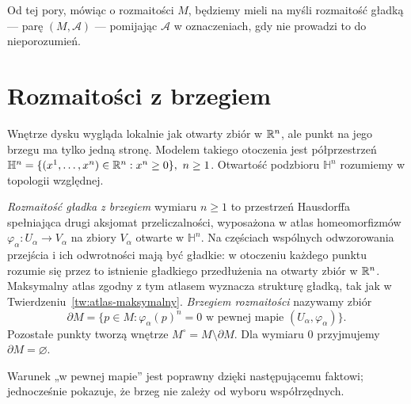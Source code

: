 Od tej pory, mówiąc o rozmaitości $M$, będziemy mieli na myśli rozmaitość gładką — parę
$(M,\mathcal{A})$ — pomijając $\mathcal{A}$ w oznaczeniach, gdy nie prowadzi to do
nieporozumień.

\section{Rozmaitości z brzegiem}
\label{sec:rozmaitosci-z-brzegiem-1}

Wnętrze dysku wygląda lokalnie jak otwarty zbiór w $\mathbb{R}^n$,
ale punkt na jego brzegu ma tylko jedną stronę. Modelem takiego
otoczenia jest półprzestrzeń $\mathbb H^n=\{(x^1,\ldots,x^n)\in\R^n:x^n\geq0\}, \ n\geq1$.
Otwartość podzbioru $\mathbb H^n$ rozumiemy w topologii względnej.

\begin{definicja}
\label{def:rozmaitosc-z-brzegiem-1}
\emph{Rozmaitość gładka z brzegiem} wymiaru $n\geq1$ to przestrzeń
Hausdorffa spełniająca drugi aksjomat przeliczalności, wyposażona
w atlas homeomorfizmów
$\varphi_\alpha:U_\alpha\to V_\alpha$ na zbiory
$V_\alpha$ otwarte w $\mathbb H^n$. Na częściach wspólnych
odwzorowania przejścia i ich odwrotności mają być gładkie:
w otoczeniu każdego punktu rozumie się przez to istnienie
gładkiego przedłużenia na otwarty zbiór w $\mathbb{R}^n$.
Maksymalny atlas zgodny z tym atlasem wyznacza strukturę gładką,
tak jak w Twierdzeniu~\ref{tw:atlas-maksymalny}.
\emph{Brzegiem rozmaitości} nazywamy zbiór
\[
 \partial M=\{p\in M:\varphi_\alpha(p)^n=0
             \text{ w pewnej mapie }(U_\alpha,\varphi_\alpha)\}.
\]
Pozostałe punkty tworzą wnętrze $M^\circ=M\setminus\partial M$.
Dla wymiaru $0$ przyjmujemy $\partial M=\varnothing$.
\end{definicja}

Warunek „w pewnej mapie” jest poprawny dzięki następującemu
faktowi; jednocześnie pokazuje, że brzeg nie zależy od wyboru
współrzędnych.

